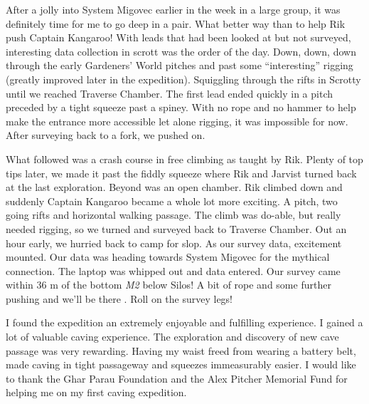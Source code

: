 After a jolly into System Migovec earlier in the week in a large group,
it was definitely time for me to go deep in a pair. What better way than
to help Rik push Captain Kangaroo! With leads that had been looked at
but not surveyed, interesting data collection in scrott was the order of
the day. Down, down, down through the early Gardeners' World pitches and
past some ``interesting'' rigging (greatly improved later in the
expedition). Squiggling through the rifts in Scrotty until we reached
Traverse Chamber. The first lead ended quickly in a pitch preceded by a
tight squeeze past a spiney. With no rope and no hammer to help make the
entrance more accessible let alone rigging, it was impossible for now.
After surveying back to a fork, we pushed on.

What followed was a crash course in free climbing as taught by Rik.
Plenty of top tips later, we made it past the fiddly squeeze where Rik
and Jarvist turned back at the last exploration. Beyond was an open
chamber. Rik climbed down and suddenly Captain Kangaroo became a whole
lot more exciting. A pitch, two going rifts and horizontal walking
passage. The climb was do-able, but really needed rigging, so we turned
and surveyed back to Traverse Chamber. Out an hour early, we hurried
back to camp for slop. As our survey data, excitement mounted. Our data
was heading towards System Migovec for the mythical connection. The
laptop was whipped out and data entered. Our survey came within 36 m of
the bottom \emph{M2} below Silos! A bit of rope and some further pushing
and we'll be there . Roll on the survey legs!

I found the expedition an extremely enjoyable and fulfilling experience.
I gained a lot of valuable caving experience. The exploration and
discovery of new cave passage was very rewarding. Having my waist freed
from wearing a battery belt, made caving in tight passageway and
squeezes immeasurably easier. I would like to thank the Ghar Parau
Foundation and the Alex Pitcher Memorial Fund for helping me on my first
caving expedition.

